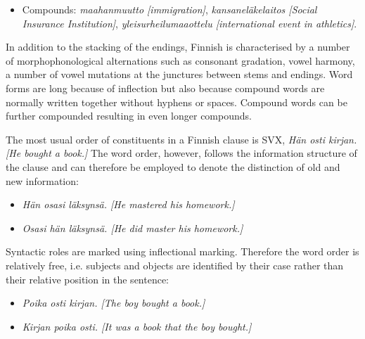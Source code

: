 \documentclass{../../metanetpaper}
\begin{document}
\begin{Parallel}[c]{79mm}{78mm}
{\begin{itemize}
\item Compounds:
   \textit{\foreignlanguage{finnish}{\textit{maahanmuutto}} [immigration]},
   \textit{\foreignlanguage{finnish}{\textit{kansaneläkelaitos}}
           [Social Insurance Institution]},
   \textit{\foreignlanguage{finnish}{\textit{yleisurheilumaaottelu}}
           [international event in athletics]}.
\end{itemize}
In addition to the stacking of the endings, Finnish is characterised by a
number of morphophonological alternations such as consonant gradation, vowel
harmony, a number of vowel mutations at the junctures between stems and
endings. Word forms are long because of inflection but also because compound
words are normally written together without hyphens or spaces. Compound words
can be further compounded resulting in even longer compounds.

The most usual order of constituents in a Finnish clause is SVX,
\textit{\foreignlanguage{finnish}{\textit{Hän osti kirjan.}}
        [He bought a book.]}
The word order, however, follows the
information structure of the clause and can therefore be employed to denote the
distinction of old and new information:
\begin{itemize}
\item \textit{\foreignlanguage{finnish}{\textit{Hän osasi läksynsä.}}
              [He mastered his homework.]}

\item \textit{\foreignlanguage{finnish}{\textit{Osasi hän läksynsä.}}
              [He did master his homework.]}
\end{itemize}

Syntactic roles are marked using inflectional marking. Therefore the word order
is relatively free, i.e. subjects and objects are identified by their case
rather than their relative position in the sentence:
\begin{itemize}
\item \textit{\foreignlanguage{finnish}{\textit{Poika osti kirjan.}}
              [The boy bought a book.]}

\item \textit{\foreignlanguage{finnish}{\textit{Kirjan poika osti.}}
              [It was a book that the boy bought.]}
\end{itemize}
}

\ParallelPar



\end{Parallel}
\end{document}
